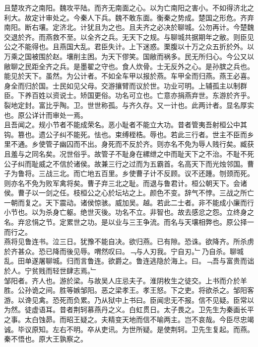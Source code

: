 \documentclass{zhvt-classic}
\begin{document}
\hspace*{2em}且楚攻齐之南阳。魏攻平陆。而齐无南面之心。以为亡南阳之害小。不如得济北之利大。故定计审处之。今秦人下兵。魏不敢东面。衡秦之势成。楚国之形危。齐弃南阳。断右壤。定济北。计犹且为之也。且夫齐之必决於聊城。公勿再计。今楚魏交退於齐。而燕救不至。以全齐之兵。无天下之规。与聊城共据期年之敝。则臣见公之不能得也。且燕国大乱。君臣失计。上下迷惑。栗腹以十万之众五折於外。以万乘之国被围於赵。壤削主困。为天下僇笑。国敝而祸多。民无所归心。今公又以敝聊之民距全齐之兵。是墨翟之守也。食人炊骨。士无反外之心。是孙膑之兵也。能见於天下。虽然。为公计者。不如全车甲以报於燕。车甲全而归燕。燕王必喜。身全而归於国。士民如见父母。交游攘臂而议於世。功业可明。上辅孤主以制群臣。下养百姓以资说士。矫国更俗。功名可立也。亡意亦捐燕弃世。东游於齐乎。裂地定封。富比乎陶。卫。世世称孤。与齐久存。又一计也。此两计者。显名厚实也。原公详计而审处一焉。\\
\hspace*{2em}且吾闻之。规小节者不能成荣名。恶小耻者不能立大功。昔者管夷吾射桓公中其钩。篡也。遗公子纠不能死。怯也。束缚桎梏。辱也。若此三行者。世主不臣而乡里不通。乡使管子幽囚而不出。身死而不反於齐。则亦名不免为辱人贱行矣。臧获且羞与之同名矣。况世俗乎。故管子不耻身在縲绁之中而耻天下之不治。不耻不死公子纠而耻威之不信於诸侯。故兼三行之过而为五霸首。名高天下而光烛邻国。曹子为鲁将。三战三北。而亡地五百里。乡使曹子计不反顾。议不还踵。刎颈而死。则亦名不免为败军禽将矣。曹子弃三北之耻。而退与鲁君计。桓公朝天下。会诸侯。曹子以一剑之任。枝桓公之心於坛坫之上。颜色不变。辞气不悖。三战之所亡一朝而复之。天下震动。诸侯惊骇。威加吴。越。若此二士者。非不能成小廉而行小节也。以为杀身亡躯。绝世灭後。功名不立。非智也。故去感忿之怨。立终身之名。弃忿悁之节。定累世之功。是以业与三王争流。而名与天壤相弊也。原公择一而行之。\\
\hspace*{2em}燕将见鲁连书。泣三日。犹豫不能自决。欲归燕。已有隙。恐诛。欲降齐。所杀虏於齐甚众。恐已降而後见辱。喟然叹曰。﹁与人刃我。宁自刃。﹂乃自杀。聊城乱。田单遂屠聊城。归而言鲁连。欲爵之。鲁连逃隐於海上。曰。﹁吾与富贵而诎於人。宁贫贱而轻世肆志焉。﹂\\
\hspace*{2em}邹阳者。齐人也。游於梁。与故吴人庄忌夫子。淮阴枚生之徒交。上书而介於羊胜。公孙诡之间。胜等嫉邹阳。恶之梁孝王。孝王怒。下之吏。将欲杀之。邹阳客游。以谗见禽。恐死而负累。乃从狱中上书曰。臣闻忠无不报。信不见疑。臣常以为然。徒虚语耳。昔者荆轲慕燕丹之义。白虹贯日。太子畏之。卫先生为秦画长平之事。太白蚀昴。而昭王疑之。夫精变天地而信不喻两主。岂不哀哉。今臣尽忠竭诚。毕议原知。左右不明。卒从吏讯。为世所疑。是使荆轲。卫先生复起。而燕。秦不悟也。原大王孰察之。\\
\end{document}
